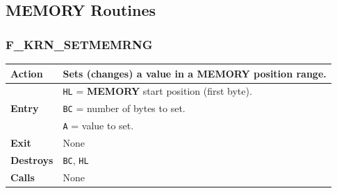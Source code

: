 \documentclass[a4paper,11pt]{article}
\begin{document}
    \subsection{MEMORY Routines}

        \subsubsection{F\_KRN\_SETMEMRNG}
        \label{func:fkrnsetmemrng}
        \begin{tabular}{l p{9cm}}
            \hline\textbf{Action}
            & Sets (changes) a value in a \textbf{MEMORY} position range.\\
            \hline\multirow[t]{3}{4em}{\textbf{Entry}}
            & \texttt{HL} = \textbf{MEMORY} start position (first byte).\\
            & \texttt{BC} = number of bytes to set.\\
            & \texttt{A} = value to set.\\
            \hline\textbf{Exit} & None\\
            \hline\textbf{Destroys} & \texttt{BC}, \texttt{HL}\\
            \hline\textbf{Calls} & None\\
            \hline
        \end{tabular}

\end{document}
